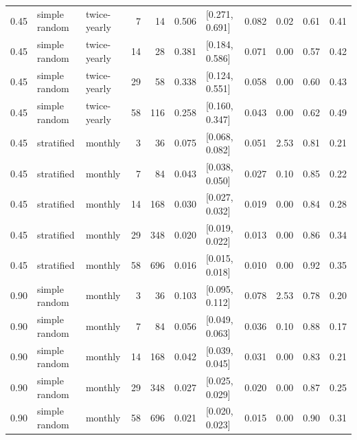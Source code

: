 \documentclass[11pt,a4paper]{article}
\begin{document}
\begin{table}[htbp]
\begin{tabular}{@{}lllrrrlrrrr@{}}
0.45 & simple random & twice-yearly &  7 &  14 & 0.506 & [0.271, 0.691] & 0.082 & 0.02 & 0.61 & 0.41 \\
0.45 & simple random & twice-yearly & 14 &  28 & 0.381 & [0.184, 0.586] & 0.071 & 0.00 & 0.57 & 0.42 \\
0.45 & simple random & twice-yearly & 29 &  58 & 0.338 & [0.124, 0.551] & 0.058 & 0.00 & 0.60 & 0.43 \\
0.45 & simple random & twice-yearly & 58 & 116 & 0.258 & [0.160, 0.347] & 0.043 & 0.00 & 0.62 & 0.49 \\
0.45 & stratified & monthly &  3 &  36 & 0.075 & [0.068, 0.082] & 0.051 & 2.53 & 0.81 & 0.21 \\
0.45 & stratified & monthly &  7 &  84 & 0.043 & [0.038, 0.050] & 0.027 & 0.10 & 0.85 & 0.22 \\
0.45 & stratified & monthly & 14 & 168 & 0.030 & [0.027, 0.032] & 0.019 & 0.00 & 0.84 & 0.28 \\
0.45 & stratified & monthly & 29 & 348 & 0.020 & [0.019, 0.022] & 0.013 & 0.00 & 0.86 & 0.34 \\
0.45 & stratified & monthly & 58 & 696 & 0.016 & [0.015, 0.018] & 0.010 & 0.00 & 0.92 & 0.35 \\
0.90 & simple random & monthly &  3 &  36 & 0.103 & [0.095, 0.112] & 0.078 & 2.53 & 0.78 & 0.20 \\
0.90 & simple random & monthly &  7 &  84 & 0.056 & [0.049, 0.063] & 0.036 & 0.10 & 0.88 & 0.17 \\
0.90 & simple random & monthly & 14 & 168 & 0.042 & [0.039, 0.045] & 0.031 & 0.00 & 0.83 & 0.21 \\
0.90 & simple random & monthly & 29 & 348 & 0.027 & [0.025, 0.029] & 0.020 & 0.00 & 0.87 & 0.25 \\
0.90 & simple random & monthly & 58 & 696 & 0.021 & [0.020, 0.023] & 0.015 & 0.00 & 0.90 & 0.31 \\
\bottomrule
\end{tabular}
\end{table}
\end{document}
